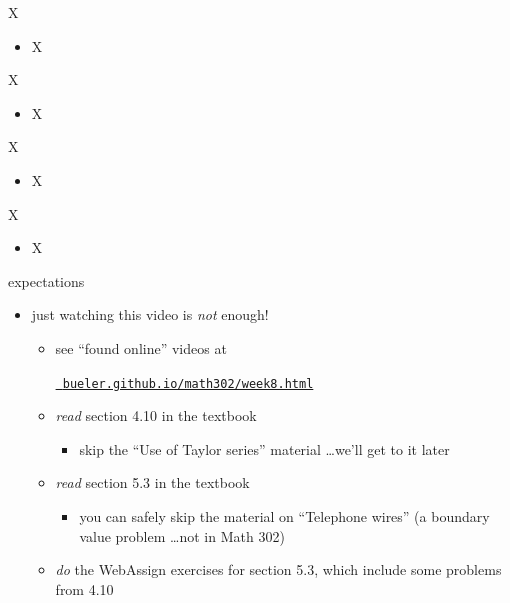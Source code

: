 \documentclass[urlcolor=blue,dvipsnames]{beamer}
\begin{document}
\begin{frame}{X}

\begin{itemize}
\item X
\end{itemize}
\end{frame}


\begin{frame}{X}

\begin{itemize}
\item X
\end{itemize}
\end{frame}


\begin{frame}{X}

\begin{itemize}
\item X
\end{itemize}
\end{frame}


\begin{frame}{X}

\begin{itemize}
\item X
\end{itemize}
\end{frame}


\begin{frame}{expectations}

\begin{itemize}
\item just watching this video is \emph{not} enough!
     \begin{itemize}
     \item see ``found online'' videos at

     \centerline{\href{https://bueler.github.io/math302/week8.html}{\tt \color{cyan} bueler.github.io/math302/week8.html}}
     \item \emph{read} section 4.10 in the textbook
         \begin{itemize}
         \item skip the ``Use of Taylor series'' material \dots we'll get to it later
         \end{itemize}
     \item \emph{read} section 5.3 in the textbook
         \begin{itemize}
         \item you can safely skip the material on ``Telephone wires'' (a boundary value problem \dots not in Math 302)
         \end{itemize}
     \item \emph{do} the WebAssign exercises for section 5.3, which include some problems from 4.10
     \end{itemize}
\end{itemize}
\end{frame}
\end{document}
